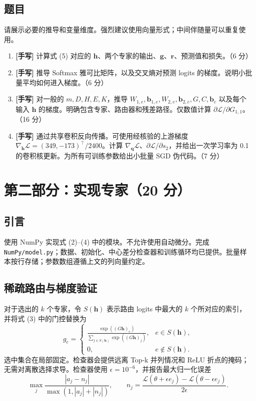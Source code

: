 \documentclass[UTF8,11pt,oneside]{ctexart}
\newcommand{\Lcal}{\mathcal{L}}
\begin{document}
\subsection{题目}
请展示必要的推导和变量维度。强烈建议使用向量形式；中间伴随量可以重复使用。
\begin{enumerate}
\item \textbf{[手写]} 计算式 (5) 对应的 $\bm{h}$、两个专家的输出、$\bm{g}$、$\bm{r}$、预测值和损失。（6 分）
\item \textbf{[手写]} 推导 Softmax 雅可比矩阵，以及交叉熵对预测 logits 的梯度。说明小批量平均如何进入梯度。（6 分）
\item \textbf{[手写]} 对一般的 $m,D,H,E,K$，推导 $W_{1,e},\bm{b}_{1,e},W_{2,e},\bm{b}_{2,e},G,C,\bm{b}_c$ 以及每个输入 $\bm{h}$ 的梯度。明确包含专家、路由器和残差路径。仅数值计算 $\partial\Lcal/\partial G_{1,1}$。（16 分）
\item \textbf{[手写]} 通过共享卷积反向传播。可使用经核验的上游梯度 $\nabla_{\bm{h}}\Lcal=(349,-173)^\top/2400$。计算 $\nabla_{\bm{q}}\Lcal$、$\partial\Lcal/\partial s_2$，并给出一次学习率为 0.1 的卷积核更新。为所有可训练参数给出小批量 SGD 伪代码。（7 分）
\end{enumerate}

\section{第二部分：实现专家（20 分）}
\subsection{引言}
使用 NumPy 实现式 (2)--(4) 中的模块。不允许使用自动微分。完成 \texttt{NumPy/model.py}；数据、初始化、中心差分检查器和训练循环均已提供。批量样本按行存储；参数数组遵循上文的列向量约定。
\subsection{稀疏路由与梯度验证}
对于选出的 $k$ 个专家，令 $S(\bm{h})$ 表示路由 logits 中最大的 $k$ 个所对应的索引，并将式 (3) 中的门控替换为
\begin{equation}
g_e=\begin{cases}\displaystyle\frac{\exp((G\bm{h})_e)}{\sum_{j\in S(\bm{h})}\exp((G\bm{h})_j)},&e\in S(\bm{h}),\\[6pt]0,&e\notin S(\bm{h}).\end{cases}\tag{6}
\end{equation}
选中集合在局部固定。检查器会提供远离 Top-k 并列情况和 ReLU 折点的掩码；无需对离散选择求导。检查器使用 $\epsilon=10^{-6}$，并报告最大归一化误差
\begin{equation}
\max_j\frac{|a_j-n_j|}{\max(1,|a_j|+|n_j|)},\qquad n_j=\frac{\Lcal(\theta+\epsilon e_j)-\Lcal(\theta-\epsilon e_j)}{2\epsilon}.\tag{7}
\end{equation}
\end{document}
